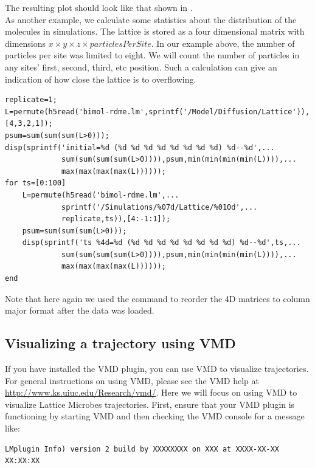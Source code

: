 The resulting plot should look like that shown in .\\

As another example, we calculate some statistics about the distribution of the molecules in  simulations. The lattice is stored as a four dimensional matrix with dimensions $x{\times}y{\times}z{\times}particlesPerSite$. In our example above, the number of particles per site was limited to eight. We will count the number of particles in any sites' first, second, third, etc position. Such a calculation can give an indication of how close the lattice is to overflowing.

{\small\begin{verbatim}
replicate=1;
L=permute(h5read('bimol-rdme.lm',sprintf('/Model/Diffusion/Lattice')),[4,3,2,1]);
psum=sum(sum(sum(L>0)));
disp(sprintf('initial=%d (%d %d %d %d %d %d %d %d) %d--%d',...
             sum(sum(sum(sum(L>0)))),psum,min(min(min(min(L)))),...
             max(max(max(max(L))))));
for ts=[0:100]
    L=permute(h5read('bimol-rdme.lm',...
             sprintf('/Simulations/%07d/Lattice/%010d',...
             replicate,ts)),[4:-1:1]);
    psum=sum(sum(sum(L>0)));
    disp(sprintf('ts %4d=%d (%d %d %d %d %d %d %d %d) %d--%d',ts,...
             sum(sum(sum(sum(L>0)))),psum,min(min(min(min(L)))),...
             max(max(max(max(L))))));
end
\end{verbatim}}

Note that here again we used the  command to reorder the 4D matrices to column major format after the data was loaded.\\

\subsection{Visualizing a trajectory using VMD}

If you have installed the VMD plugin, you can use VMD to visualize  trajectories. For general instructions on using VMD, please see the VMD help at \url{http://www.ks.uiuc.edu/Research/vmd/}. Here we will focus on using VMD to visualize Lattice Microbes trajectories. First, ensure that your VMD plugin is functioning by starting VMD and then checking the VMD console for a message like:

{\small\begin{verbatim}
LMplugin Info) version 2 build by XXXXXXXX on XXX at XXXX-XX-XX XX:XX:XX
\end{verbatim}}

